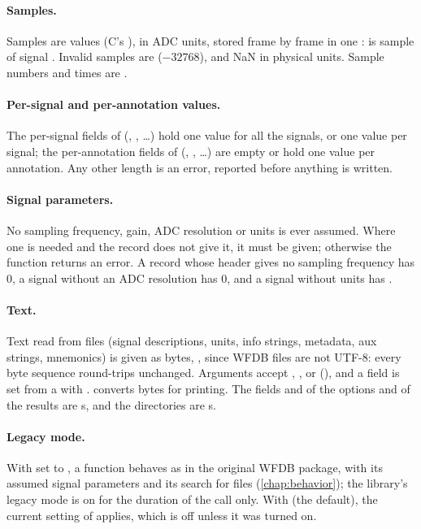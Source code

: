 \paragraph{Samples.} Samples are  values (C's ), in ADC
units, stored frame by frame in one :  is
sample  of signal . Invalid samples are 
($-32768$), and NaN in physical units. Sample numbers and times are .

\paragraph{Per-signal and per-annotation values.} The per-signal fields of
 (, , \ldots) hold one value for all the
signals, or one value per signal; the per-annotation fields of 
(, , \ldots) are empty or hold one value per annotation. Any
other length is an error, reported before anything is written.

\paragraph{Signal parameters.} No sampling frequency, gain, ADC resolution or units is
ever assumed. Where one is needed and the record does not give it, it must be given;
otherwise the function returns an error. A record whose header gives no sampling
frequency has  0, a signal without an ADC resolution has  0, and a
signal without units has  .

\paragraph{Text.} Text read from files (signal descriptions, units, info strings,
metadata, aux strings, mnemonics) is given as bytes, , since WFDB files are
not UTF-8: every byte sequence round-trips unchanged. Arguments accept ,
\code{\&[u8]},  or  (), and a
 field is set from a  with .
 converts bytes for printing. The fields
 and  of the options and  of the results
are s, and the directories  are s.

\paragraph{Legacy mode.} With  set to , a function behaves as in
the original WFDB package, with its assumed signal parameters and its search for files
(\cref{chap:behavior}); the library's legacy mode is on for the duration of the call
only. With  (the default), the current setting of 
applies, which is off unless it was turned on.

